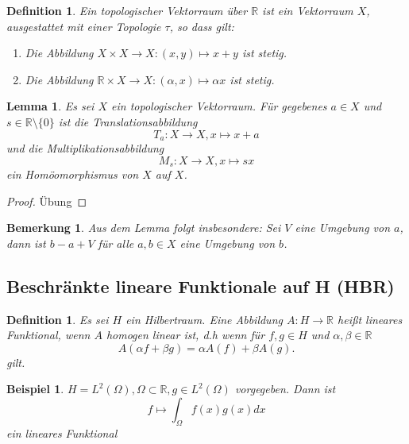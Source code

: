 \documentclass[12pt,titlepage]{article}
\newtheorem{definition}[zahl]{Definition}
\newtheorem{lemma}[zahl]{Lemma}
\newtheorem{bsp}[zahl]{Beispiel}
\newtheorem{bemerkung}[zahl]{Bemerkung}
\numberwithin{equation}{section}
\begin{document}
\begin{definition}
Ein topologischer Vektorraum über $\mathbb{R}$ ist ein Vektorraum $X$, ausgestattet mit einer Topologie $\tau $, so dass gilt:
\begin{enumerate}
\item Die Abbildung $X \times X \to X:(x,y)\mapsto x+y$ ist stetig.
\item Die Abbildung $\mathbb{R}\times X\to X:(\alpha,x) \mapsto \alpha x$ ist stetig.
\end{enumerate}
\end{definition}
\begin{lemma}
Es sei $X$ ein topologischer Vektorraum. Für gegebenes $a\in X$ und $s\in \mathbb{R}\setminus \{0\}$ ist die Translationsabbildung
\[
T_a:X \to X,x \mapsto x+a
\] und die Multiplikationsabbildung
\[
M_s:X\to X,x\mapsto sx
\] ein Homöomorphismus von $X$ auf $X$.
\end{lemma}
\begin{proof}
Übung
\end{proof}
\begin{bemerkung}
Aus dem Lemma folgt insbesondere: Sei $V$ eine Umgebung von $a$, dann ist $b-a+V$ für alle $a,b \in X$ eine Umgebung von $b$.
\end{bemerkung}
\subsection{Beschränkte lineare Funktionale auf H (HBR)}
\begin{definition}
Es sei $H$ ein Hilbertraum. Eine Abbildung $A:H \to \mathbb{R}$ heißt lineares Funktional, wenn $A$ homogen linear ist, d.h wenn für $f,g \in H$ und $\alpha,\beta\in \mathbb{R}$ 
\[
A(\alpha f+ \beta g)=\alpha A(f)+\beta A(g).
\]gilt.
\end{definition}
\begin{bsp}
$H=L^2(\Omega),\Omega \subset \mathbb{R}, g \in L^2(\Omega) $ vorgegeben. Dann ist 
\[ 
f\mapsto \int_{\Omega} f(x)g(x)dx
\] ein lineares Funktional
\end{bsp}
\end{document}
